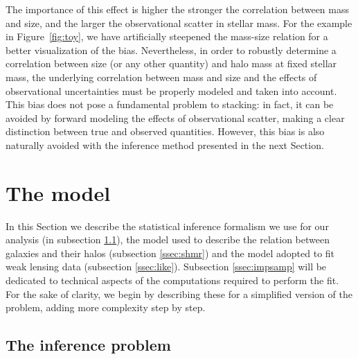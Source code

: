 \documentclass[usenatbib]{mnras}
\def\Fref#1{Figure~\ref{#1}\xspace}
\begin{document}
The importance of this effect is higher the stronger the correlation between mass and size, and the larger the observational scatter in stellar mass. 
For the example in \Fref{fig:toy}, we have artificially steepened the mass-size relation for a better visualization of the bias.
Nevertheless,
in order to robustly determine a correlation between size (or any other quantity) and halo mass at fixed stellar mass, the underlying correlation between mass and size and the effects of observational uncertainties must be properly modeled and taken into account.
This bias does not pose a fundamental problem to stacking: in fact, it can be avoided by forward modeling the effects of observational scatter, making a clear distinction between true and observed quantities. However, this bias is also naturally avoided with the inference method presented in the next Section.


\section{The model}\label{sect:model}

In this Section we describe the statistical inference formalism we use for our analysis (in subsection \ref{ssec:form}), the model used to describe the relation  between galaxies and their halos (subsection \ref{ssec:shmr}) and the model adopted to fit weak lensing data (subsection \ref{ssec:like}).
Subsection \ref{ssec:impsamp} will be dedicated to technical aspects of the computations required to perform the fit.
For the sake of clarity, we begin by describing these for a simplified version of the problem, adding more complexity step by step.

\subsection{The inference problem}\label{ssec:form}
\end{document}
